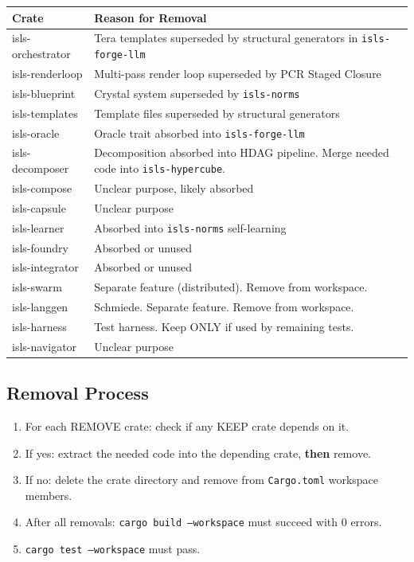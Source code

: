 \documentclass[11pt,a4paper]{article}
\begin{document}
\begin{center}
\small
\begin{tabular}{>{\ttfamily}l p{8.5cm}}
\toprule
\textbf{Crate} & \textbf{Reason for Removal} \\
\midrule
isls-orchestrator & Tera templates superseded by structural generators in \texttt{isls-forge-llm} \\
isls-renderloop & Multi-pass render loop superseded by PCR Staged Closure \\
isls-blueprint & Crystal system superseded by \texttt{isls-norms} \\
isls-templates & Template files superseded by structural generators \\
isls-oracle & Oracle trait absorbed into \texttt{isls-forge-llm} \\
isls-decomposer & Decomposition absorbed into HDAG pipeline. Merge needed code into \texttt{isls-hypercube}. \\
isls-compose & Unclear purpose, likely absorbed \\
isls-capsule & Unclear purpose \\
isls-learner & Absorbed into \texttt{isls-norms} self-learning \\
isls-foundry & Absorbed or unused \\
isls-integrator & Absorbed or unused \\
isls-swarm & Separate feature (distributed). Remove from workspace. \\
isls-langgen & Schmiede. Separate feature. Remove from workspace. \\
isls-harness & Test harness. Keep ONLY if used by remaining tests. \\
isls-navigator & Unclear purpose \\
\bottomrule
\end{tabular}
\end{center}

\subsection{Removal Process}

\begin{enumerate}
\item For each REMOVE crate: check if any KEEP crate depends on it.
\item If yes: extract the needed code into the depending crate, \textbf{then} remove.
\item If no: delete the crate directory and remove from \texttt{Cargo.toml} workspace members.
\item After all removals: \texttt{cargo build --workspace} must succeed with 0 errors.
\item \texttt{cargo test --workspace} must pass.
\end{enumerate}
\end{document}
